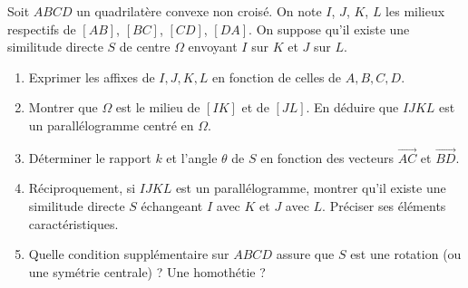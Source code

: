 \documentclass[11pt]{article}
\begin{document}
\begin{exercice}
Soit $ABCD$ un quadrilatère convexe non croisé. On note $I$, $J$, $K$, $L$ les milieux respectifs de $[AB]$, $[BC]$, $[CD]$, $[DA]$. On suppose qu'il existe une similitude directe $S$ de centre $\Omega$ envoyant $I$ sur $K$ et $J$ sur $L$.
\begin{enumerate}
    \item Exprimer les affixes de $I, J, K, L$ en fonction de celles de $A, B, C, D$.
    \item Montrer que $\Omega$ est le milieu de $[IK]$ et de $[JL]$. En déduire que $IJKL$ est un parallélogramme centré en $\Omega$.
    \item Déterminer le rapport $k$ et l'angle $\theta$ de $S$ en fonction des vecteurs $\overrightarrow{AC}$ et $\overrightarrow{BD}$.
    \item Réciproquement, si $IJKL$ est un parallélogramme, montrer qu'il existe une similitude directe $S$ échangeant $I$ avec $K$ et $J$ avec $L$. Préciser ses éléments caractéristiques.
    \item Quelle condition supplémentaire sur $ABCD$ assure que $S$ est une rotation (ou une symétrie centrale) ? Une homothétie ?
\end{enumerate}
\end{exercice}
\end{document}
